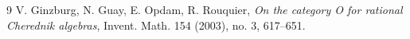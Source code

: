 \documentclass[12pt, a4paper]{amsart}
\begin{document}
\begin{thebibliography}{9}
 {\sc V. Ginzburg, N. Guay, E. Opdam, R. Rouquier},
{\em On the category O for rational Cherednik algebras},
Invent. Math. 154 (2003), no. 3, 617–651.

\end{thebibliography}
\end{document}
